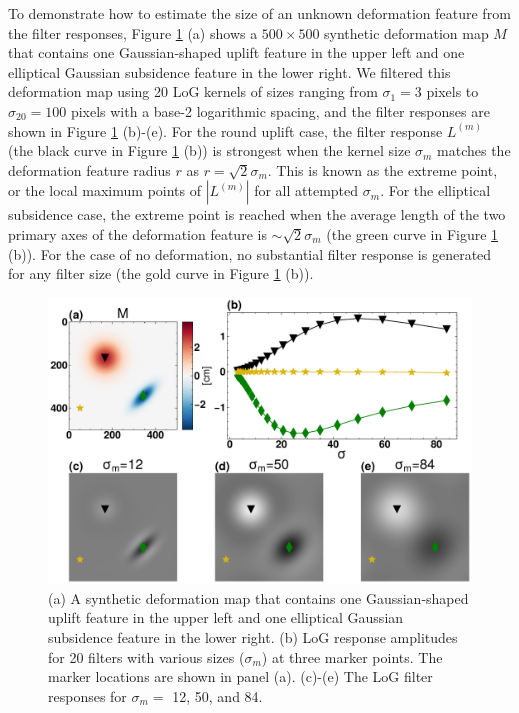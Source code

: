 To demonstrate how to estimate the size of an unknown deformation feature from the filter responses, Figure \ref{fig:log-response} (a) shows a $500 \times 500$ synthetic deformation map $M$ that contains one Gaussian-shaped uplift feature in the upper left and one elliptical Gaussian subsidence feature in the lower right. We filtered this deformation map using 20 LoG kernels of sizes ranging from $\sigma_1 = 3$ pixels to $\sigma_{20} = 100$ pixels with a base-2 logarithmic spacing, and the filter responses are shown in Figure \ref{fig:log-response} (b)-(e). For the round uplift case, the filter response $L^{(m)}$ (the black curve in Figure \ref{fig:log-response} (b)) is strongest when the kernel size $\sigma_m$ matches the deformation feature radius $r$ as $r = \sqrt{2}\sigma_m$. This is known as the extreme point, or the local maximum points of $|L^{(m)}|$ for all attempted $\sigma_m$. For the elliptical subsidence case, the extreme point is reached when the average length of the two primary axes of the deformation feature is $\sim \sqrt{2}\sigma_m$ (the green curve in Figure \ref{fig:log-response} (b)). For the case of no deformation, no substantial filter response is generated for any filter size (the gold curve in Figure \ref{fig:log-response} (b)).



\begin{figure}[hbt!]
	\centering
	\includegraphics[width=0.98\linewidth]{paper2/figures/figure2_log_response.pdf}
	\caption[LoG filter responses to synthetic deformation]{
		(a) A synthetic deformation map that contains one Gaussian-shaped uplift feature in the upper left and one elliptical Gaussian subsidence feature in the lower right. (b) LoG response amplitudes for 20 filters with various sizes ($\sigma_m$) at three marker points. The marker locations are shown in panel (a). (c)-(e) The LoG filter responses for $\sigma_m=$ 12, 50, and 84.}
	\label{fig:log-response}
\end{figure}

